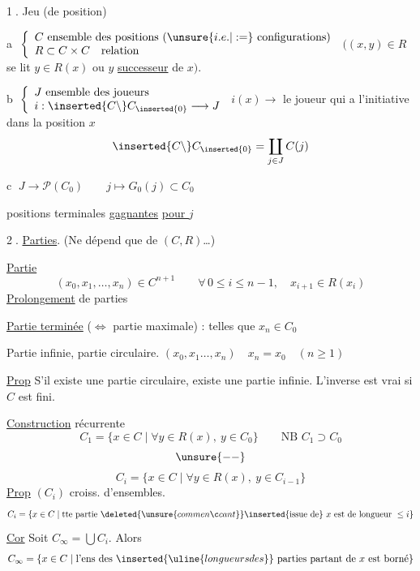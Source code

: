 \textcircled{1.} Jeu (de position)

\textcircled{a} $\left\{\begin{array}{l} C\text{ ensemble des positions }(\unsure{i.e.|:=}\text{ configurations})\\ R\subset C\times C\quad\text{relation}\end{array}\right.$
$((x,y)\in R$ se lit $y\in R(x)$ ou $y$ \uline{successeur} de $x)$.


\textcircled{b} $\left\{\begin{array}{l}J\text{ ensemble des joueurs}\\ i:\inserted{C\setminus}C_{\inserted{0}}\longrightarrow J\end{array}\right.$
$i(x)\longrightarrow$ le joueur qui a l'initiative dans la position $x$
\[
\inserted{C\setminus}C_{\inserted{0}}=\coprod_{j\in J}C(j)
\]

\textcircled{c} $J\longrightarrow\mathcal P(C_0)\qquad j\longmapsto G_0(j)\subset C_0$
\begin{center}positions terminales \uline{gagnantes} \uline{pour $j$}\end{center}

\textcircled{2.} \uline{Parties}.
 (Ne dépend que de $(C,R)$\ldots)

\uline{Partie} 
\[
(x_0,x_1,\ldots,x_n)\in C^{n+1}\qquad \forall\,0\leq i\leq n-1,\quad x_{i+1}\in R(x_i)
\]
\uline{Prolongement} de parties

\uline{Partie terminée} ($\Leftrightarrow$ partie maximale) : telles que $x_n\in C_0$

Partie infinie, partie circulaire. $(x_0,x_1\ldots,x_n)\quad x_n=x_0\quad(n\geq1)$

\uline{Prop} S'il existe une partie circulaire, existe une partie infinie. L'inverse est vrai si $C$ est fini.

\uline{Construction} récurrente
\inserted{\[
C_{-1}=\varnothing\qquad C_0=\{x\in C\mid\forall y\in R(x),\ y\in C_{-1}\}=\{x\in C\mid R(x)=\varnothing\}
\]}
\[
C_1=\{x\in C\mid\forall y\in R(x),\ y\in C_0\}\qquad\text{NB }C_1\supset C_0
\]
\[
\unsure{--}
\]
\[
C_i=\{x\in C\mid\forall y\in R(x),\ y\in C_{i-1}\}
\]
\uline{Prop} $(C_i)$   croiss. d'ensembles.
\[
C_i=\{x\in C\mid\text{tte partie }\deleted{\unsure{commençant}}\inserted{\text{issue de}}\ x\text{ est de longueur }\leq i\}
\]
\uline{Cor} Soit $C_\infty=\bigcup C_i$. Alors
\[
C_\infty=\{x\in C\mid\text{l'ens des }\inserted{\uline{longueurs des}}\text{ parties partant de }x\text{ est borné}\}
\]

